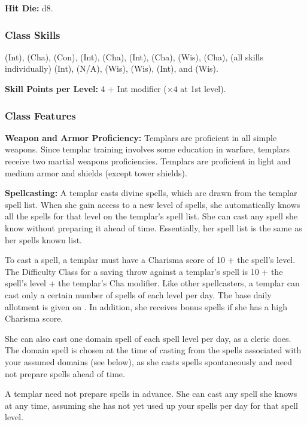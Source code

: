 \textbf{Hit Die:} d8.

\subsubsection{Class Skills}
 (Int),  (Cha),  (Con),  (Int),  (Cha),  (Int),  (Cha),  (Wis),  (Cha),  (all skills individually) (Int),  (N/A),  (Wis),  (Wis),  (Int), and  (Wis).

\textbf{Skill Points per Level:} 4 + Int modifier ($\times 4$ at 1st level).

\subsubsection{Class Features}

\textbf{Weapon and Armor Proficiency:} Templars are proficient in all simple weapons. Since templar training involves some education in warfare, templars receive two martial weapons proficiencies. Templars are proficient in light and medium armor and shields (except tower shields).

\textbf{Spellcasting:} A templar casts divine spells, which are drawn from the templar spell list. When she gain access to a new level of spells, she automatically knows all the spells for that level on the templar's spell list. She can cast any spell she know without preparing it ahead of time. Essentially, her spell list is the same as her spells known list.

To cast a spell, a templar must have a Charisma score of 10 + the spell's level. The Difficulty Class for a saving throw against a templar's spell is 10 + the spell's level + the templar's Cha modifier. Like other spellcasters,
a templar can cast only a certain number of spells of each level per day. The base daily allotment is given on . In addition, she receives bonus spells if she has a high Charisma score.

She can also cast one domain spell of each spell level per day, as a cleric does. The domain spell is chosen at the time of casting from the spells associated with your assumed domains (see below), as she casts spells spontaneously and need not prepare spells ahead of time.

A templar need not prepare spells in advance. She can cast any spell she knows at any time, assuming she has not yet used up your spells per day for that spell level.

